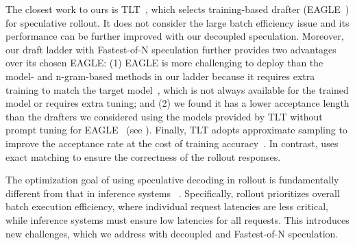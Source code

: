 The closest work to ours is TLT~\cite{tlt}, 
which selects training-based drafter (EAGLE~\cite{eagle,eagle-2,eagle-3}) 
for speculative rollout. 
It does not consider the large batch efficiency issue and 
its performance can be further improved with our decoupled speculation.
Moreover, our draft ladder with Fastest-of-N speculation 
further provides two advantages over its chosen EAGLE:
(1) EAGLE is more challenging to deploy than the model- and n-gram-based methods 
in our ladder because it requires extra training to match the target model~\cite{eagle-2,eagle-3}, 
which is not always available for the trained model or requires extra tuning; and
(2) we found it has a lower acceptance length than the drafters 
we considered using the models provided by TLT without prompt tuning for EAGLE~\cite{tlt-code} (see ).
Finally, TLT adopts approximate sampling to improve the acceptance rate 
at the cost of training accuracy~\cite{DBLP:journals/corr/abs-2510-26475}.
In contrast, {\sys} uses exact matching to ensure the correctness of the rollout responses.

The optimization goal of using speculative decoding 
in rollout is fundamentally different from that in inference systems
~\cite{spd,specinfer,pearl,swiftspec,DBLP:conf/icml/LiuHBCDS024,turbospec}. 
Specifically, rollout prioritizes overall batch execution efficiency, 
where individual request latencies are less critical, 
while inference systems must ensure low latencies for all requests. 
This introduces new challenges, which we address with decoupled and 
Fastest-of-N speculation.

